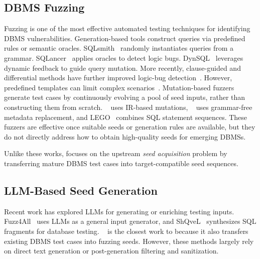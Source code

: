 \documentclass[conference]{IEEEtran}
\begin{document}
\subsection{DBMS Fuzzing}
Fuzzing is one of the most effective automated testing techniques for identifying DBMS vulnerabilities.
Generation-based tools construct queries via predefined rules or semantic oracles. 
SQLsmith~\cite{sqlsmith} randomly instantiates queries from a grammar. 
SQLancer~\cite{sqlancer,rigger2020testing} applies oracles to detect logic bugs.
DynSQL~\cite{jiang2023dynsql} leverages dynamic feedback to guide query mutation. 
More recently, clause-guided and differential methods have further improved logic-bug detection~\cite{wei2024sqlaser, ba2023testing, song2023testing, cui2022differentially, hao2023pinolo}.
However, predefined templates can limit complex scenarios~\cite{gao2023comprehensive}. 
Mutation-based fuzzers generate test cases by continuously evolving a pool of seed inputs, rather than constructing them from scratch. 
\squirrel{}~\cite{zhong2020squirrel} uses IR-based mutations, \griffin{}~\cite{fu2022griffin} uses grammar-free metadata replacement, and LEGO~\cite{liang2023sequence} combines SQL statement sequences. 
These fuzzers are effective once suitable seeds or generation rules are available, but they do not directly address how to obtain high-quality seeds for emerging DBMSs.

Unlike these works, \tool{} focuses on the upstream \textit{seed acquisition} problem by transferring mature DBMS test cases into target-compatible seed sequences.

\subsection{LLM-Based Seed Generation}
Recent work has explored LLMs for generating or enriching testing inputs.
Fuzz4All~\cite{xia2024fuzz4all} uses LLMs as a general input generator, and ShQveL~\cite{zhong2025testing} synthesizes SQL fragments for database testing.
\sedar{}~\cite{fu2024sedar} is the closest work to \tool{} because it also transfers existing DBMS test cases into fuzzing seeds.
However, these methods largely rely on direct text generation or post-generation filtering and sanitization.
\end{document}
